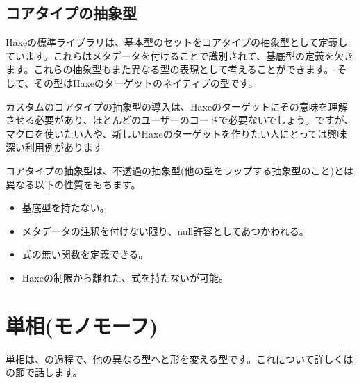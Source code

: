 \subsection{コアタイプの抽象型}
\label{types-abstract-core-type}

Haxeの標準ライブラリは、基本型のセットをコアタイプの抽象型として定義しています。これらはメタデータを付けることで識別されて、基底型の定義を欠きます。これらの抽象型もまた異なる型の表現として考えることができます。
そして、その型はHaxeのターゲットのネイティブの型です。

カスタムのコアタイプの抽象型の導入は、Haxeのターゲットにその意味を理解させる必要があり、ほとんどのユーザーのコードで必要ないでしょう。ですが、マクロを使いたい人や、新しいHaxeのターゲットを作りたい人にとっては興味深い利用例があります

コアタイプの抽象型は、不透過の抽象型(他の型をラップする抽象型のこと)とは異なる以下の性質をもちます。

\begin{itemize}
	\item 基底型を持たない。
	\item {}メタデータの注釈を付けない限り、null許容としてあつかわれる。
	\item 式の無い関数を定義できる。
	\item Haxeの制限から離れた、式を持たないが可能。
\end{itemize}



\section{単相(モノモーフ)}
\label{types-monomorph}

単相は、の過程で、他の異なる型へと形を変える型です。これについて詳しくはの節で話します。
